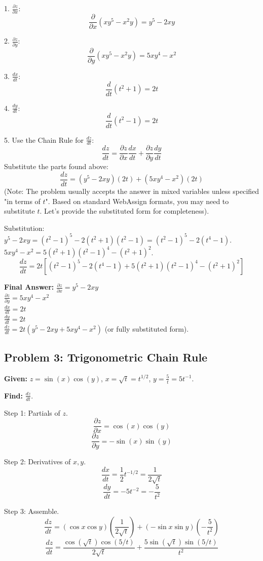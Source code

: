 \documentclass[11pt, letterpaper]{article}
\theoremstyle{definition}
\begin{document}
1. $\frac{\partial z}{\partial x}$:
\[ \frac{\partial}{\partial x}(xy^5 - x^2y) = y^5 - 2xy \]

2. $\frac{\partial z}{\partial y}$:
\[ \frac{\partial}{\partial y}(xy^5 - x^2y) = 5xy^4 - x^2 \]

3. $\frac{dx}{dt}$:
\[ \frac{d}{dt}(t^2+1) = 2t \]

4. $\frac{dy}{dt}$:
\[ \frac{d}{dt}(t^2-1) = 2t \]

5. Use the Chain Rule for $\frac{dz}{dt}$:
\[ \frac{dz}{dt} = \frac{\partial z}{\partial x}\frac{dx}{dt} + \frac{\partial z}{\partial y}\frac{dy}{dt} \]
Substitute the parts found above:
\[ \frac{dz}{dt} = (y^5 - 2xy)(2t) + (5xy^4 - x^2)(2t) \]
(Note: The problem usually accepts the answer in mixed variables unless specified "in terms of $t$". Based on standard WebAssign formats, you may need to substitute $t$. Let's provide the substituted form for completeness).

Substitution:
$y^5 - 2xy = (t^2-1)^5 - 2(t^2+1)(t^2-1) = (t^2-1)^5 - 2(t^4-1)$.
$5xy^4 - x^2 = 5(t^2+1)(t^2-1)^4 - (t^2+1)^2$.
\[ \frac{dz}{dt} = 2t \left[ (t^2-1)^5 - 2(t^4-1) + 5(t^2+1)(t^2-1)^4 - (t^2+1)^2 \right] \]

\textbf{Final Answer:}
$\frac{\partial z}{\partial x} = \boxed{y^5 - 2xy}$ \\
$\frac{\partial z}{\partial y} = \boxed{5xy^4 - x^2}$ \\
$\frac{dx}{dt} = \boxed{2t}$ \\
$\frac{dy}{dt} = \boxed{2t}$ \\
$\frac{dz}{dt} = \boxed{2t(y^5 - 2xy + 5xy^4 - x^2)}$ (or fully substituted form).


\subsection*{Problem 3: Trigonometric Chain Rule}
\textbf{Given:} $z = \sin(x)\cos(y)$, $x = \sqrt{t} = t^{1/2}$, $y = \frac{5}{t} = 5t^{-1}$.

\textbf{Find:} $\frac{dz}{dt}$.

Step 1: Partials of $z$.
\[ \frac{\partial z}{\partial x} = \cos(x)\cos(y) \]
\[ \frac{\partial z}{\partial y} = -\sin(x)\sin(y) \]

Step 2: Derivatives of $x, y$.
\[ \frac{dx}{dt} = \frac{1}{2}t^{-1/2} = \frac{1}{2\sqrt{t}} \]
\[ \frac{dy}{dt} = -5t^{-2} = -\frac{5}{t^2} \]

Step 3: Assemble.
\[ \frac{dz}{dt} = (\cos x \cos y)\left(\frac{1}{2\sqrt{t}}\right) + (-\sin x \sin y)\left(-\frac{5}{t^2}\right) \]
\[ \frac{dz}{dt} = \frac{\cos(\sqrt{t})\cos(5/t)}{2\sqrt{t}} + \frac{5\sin(\sqrt{t})\sin(5/t)}{t^2} \]
\end{document}
